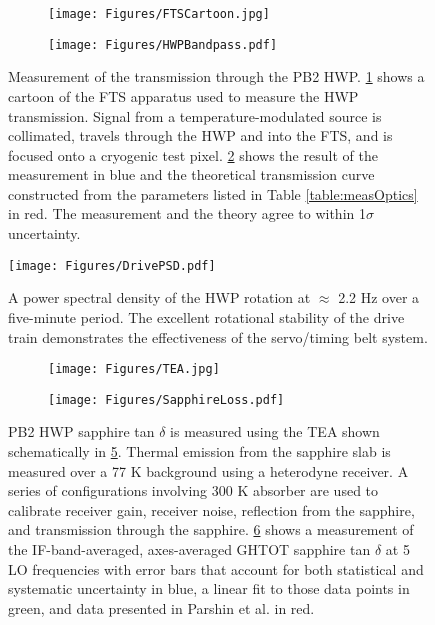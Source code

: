 \begin{figure}
\centering
\begin{subfigure}{.49\textwidth}
  	\centering
  	\texttt{[image: Figures/FTSCartoon.jpg]}
   	\caption{\label{fig:FTS}}
\end{subfigure}%
\begin{subfigure}{.51\textwidth}
  	\centering
  	\texttt{[image: Figures/HWPBandpass.pdf]}
  	\caption{\label{fig:hwpBandpass}}
\end{subfigure}
\caption{Measurement of the transmission through the PB2 HWP. \ref{fig:FTS} shows a cartoon of the FTS apparatus used to measure the HWP transmission. Signal from a temperature-modulated source is collimated, travels through the HWP and into the FTS, and is focused onto a cryogenic test pixel. \ref{fig:hwpBandpass} shows the result of the measurement in blue and the theoretical transmission curve constructed from the parameters listed in Table \ref{table:measOptics} in red. The measurement and the theory agree to within 1$\sigma$ uncertainty. \label{fig:bandpass}}
\end{figure}

\begin{figure}
\centering
	\texttt{[image: Figures/DrivePSD.pdf]}
	\caption{A power spectral density of the HWP rotation at $\approx$ 2.2 Hz over a five-minute period. The excellent rotational stability of the drive train demonstrates the effectiveness of the servo/timing belt system. \label{fig:motorPSD}}
\end{figure}

\begin{figure}[h!]
\centering
\begin{subfigure}
  	\centering
  	\texttt{[image: Figures/TEA.jpg]}
   	\caption{\label{fig:tea}}
\end{subfigure}%
\begin{subfigure}
  	\centering
  	\texttt{[image: Figures/SapphireLoss.pdf]}
  	\caption{\label{fig:sappLT}}
\end{subfigure}
\caption{PB2 HWP sapphire tan $\delta$ is measured using the TEA shown schematically in \ref{fig:tea}. Thermal emission from the sapphire slab is measured over a 77 K background using a heterodyne receiver. A series of configurations involving 300 K absorber are used to calibrate receiver gain, receiver noise, reflection from the sapphire, and transmission through the sapphire. \ref{fig:sappLT} shows a measurement of the IF-band-averaged, axes-averaged GHTOT sapphire tan $\delta$ at 5 LO frequencies with error bars that account for both statistical and systematic uncertainty in blue, a linear fit to those data points in green, and data presented in Parshin et al. \cite{parshin} in red. \label{fig:Sapphire}}
\end{figure}

